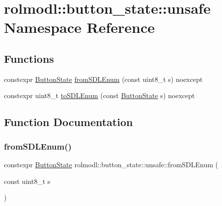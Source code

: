 \hypertarget{namespacerolmodl_1_1button__state_1_1unsafe}{}\section{rolmodl\+::button\+\_\+state\+::unsafe Namespace Reference}
\label{namespacerolmodl_1_1button__state_1_1unsafe}
\subsection*{Functions}
\begin{DoxyCompactItemize}
\item 
constexpr \mbox{\hyperlink{namespacerolmodl_ad08ec5c56aa1db118f871357b2d475fd}{Button\+State}} \mbox{\hyperlink{namespacerolmodl_1_1button__state_1_1unsafe_a1aed3db737f80c253d75e387dc20b0f1}{from\+S\+D\+L\+Enum}} (const uint8\+\_\+t s) noexcept
\item 
constexpr uint8\+\_\+t \mbox{\hyperlink{namespacerolmodl_1_1button__state_1_1unsafe_a715b8808fafb95acdf52ce45105892f8}{to\+S\+D\+L\+Enum}} (const \mbox{\hyperlink{namespacerolmodl_ad08ec5c56aa1db118f871357b2d475fd}{Button\+State}} s) noexcept
\end{DoxyCompactItemize}


\subsection{Function Documentation}
\mbox{\label{namespacerolmodl_1_1button__state_1_1unsafe_a1aed3db737f80c253d75e387dc20b0f1}} 
\subsubsection{\texorpdfstring{fromSDLEnum()}{fromSDLEnum()}}
{\footnotesize\ttfamily constexpr \mbox{\hyperlink{namespacerolmodl_ad08ec5c56aa1db118f871357b2d475fd}{Button\+State}} rolmodl\+::button\+\_\+state\+::unsafe\+::from\+S\+D\+L\+Enum (\begin{DoxyParamCaption}\item[{const uint8\+\_\+t}]{s }\end{DoxyParamCaption})\hspace{0.3cm}{\ttfamily [noexcept]}}



